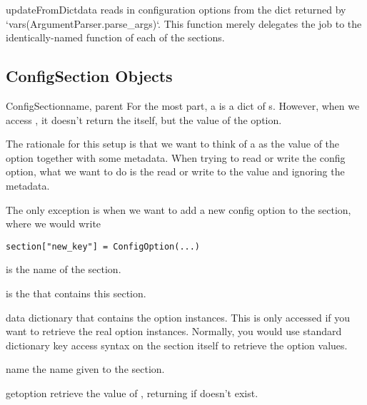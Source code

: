 \begin{methoddesc}[ConfigManager]{updateFromDict}{data}
  reads in configuration options from the dict returned by
  `vars(ArgumentParser.parse_args)`. This function merely delegates the job to
  the identically-named function of each of the sections.
\end{methoddesc}

\subsection{ConfigSection Objects}

\begin{classdesc}{ConfigSection}{name, parent}
For the most part, a  is a dict of s.
However, when we access , it doesn't return the
 itself, but the value of the option.

The rationale for this setup is that we want to think of a 
as the value of the option together with some metadata. When trying to read or
write the config option, what we want to do is the read or write to the value
and ignoring the metadata.

The only exception is when we want to add a new config option to the section,
where we would write
\begin{verbatim}
section["new_key"] = ConfigOption(...)
\end{verbatim}

 is the name of the section.

 is the  that contains this section.
\end{classdesc}

\begin{memberdesc}[ConfigSection]{data}
dictionary that contains the option instances. This is only accessed if you
want to retrieve the real option instances. Normally, you would use standard
dictionary key access syntax on the section itself to retrieve the option
values.
\end{memberdesc}

\begin{memberdesc}[ConfigSection]{name}
the name given to the section.
\end{memberdesc}

\begin{methoddesc}[ConfigManager]{get}{option}
retrieve the value of , returning  if  doesn't exist.
\end{methoddesc}

